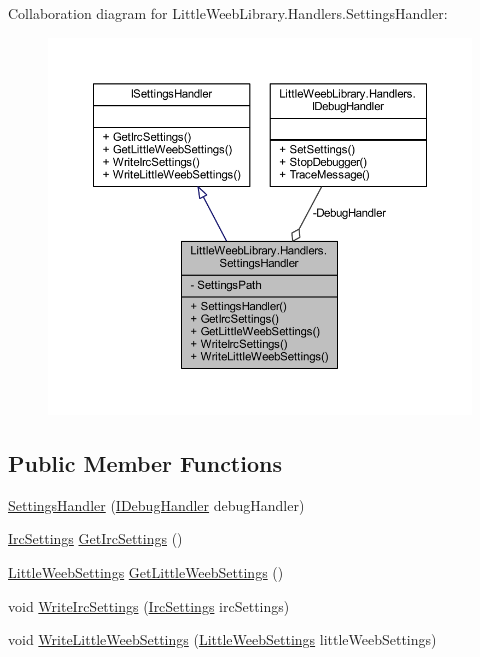 Collaboration diagram for Little\+Weeb\+Library.\+Handlers.\+Settings\+Handler\+:\nopagebreak
\begin{figure}[H]
\begin{center}
\leavevmode
\includegraphics[width=350pt]{class_little_weeb_library_1_1_handlers_1_1_settings_handler__coll__graph}
\end{center}
\end{figure}
\subsection*{Public Member Functions}
\begin{DoxyCompactItemize}
\item 
\mbox{\hyperlink{class_little_weeb_library_1_1_handlers_1_1_settings_handler_a6b11494ae34a6ff54b825941ef06cdb2}{Settings\+Handler}} (\mbox{\hyperlink{interface_little_weeb_library_1_1_handlers_1_1_i_debug_handler}{I\+Debug\+Handler}} debug\+Handler)
\item 
\mbox{\hyperlink{class_little_weeb_library_1_1_settings_1_1_irc_settings}{Irc\+Settings}} \mbox{\hyperlink{class_little_weeb_library_1_1_handlers_1_1_settings_handler_a22195b5d1df129295e0e30298611bdba}{Get\+Irc\+Settings}} ()
\item 
\mbox{\hyperlink{class_little_weeb_library_1_1_settings_1_1_little_weeb_settings}{Little\+Weeb\+Settings}} \mbox{\hyperlink{class_little_weeb_library_1_1_handlers_1_1_settings_handler_a53a5c5206eb6d2c58fa9d970c9b97463}{Get\+Little\+Weeb\+Settings}} ()
\item 
void \mbox{\hyperlink{class_little_weeb_library_1_1_handlers_1_1_settings_handler_ad42462e9e851301c5f5b91663dc3fe24}{Write\+Irc\+Settings}} (\mbox{\hyperlink{class_little_weeb_library_1_1_settings_1_1_irc_settings}{Irc\+Settings}} irc\+Settings)
\item 
void \mbox{\hyperlink{class_little_weeb_library_1_1_handlers_1_1_settings_handler_af5a1ea4a3605d938b363e83268774d6f}{Write\+Little\+Weeb\+Settings}} (\mbox{\hyperlink{class_little_weeb_library_1_1_settings_1_1_little_weeb_settings}{Little\+Weeb\+Settings}} little\+Weeb\+Settings)
\end{DoxyCompactItemize}
